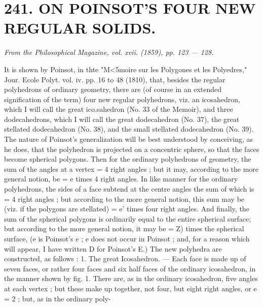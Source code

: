 \documentclass[11pt,a4paper]{book}
\begin{document}
\section*{241. ON  POINSOT'S  FOUR   NEW   REGULAR   SOLIDS.}
\begin{flushright}
\textit{From  the  Philosophical  Magazine,  vol.  xvii.  (1859),  pp.  123 — 128.}\n\end{flushright}
\vspace{0.5em}
It  is  shown  by  Poinsot,  in  thte  "M<5moire  sur  les  Polygones  et  les  Polyedres,"
Jour.  Ecole  Polyt.  vol.  iv.  pp.  16  to  48  (1810),  that,  besides  the  regular  polyhedrons  of
ordinary  geometry,  there  are  (of  course  in  an  extended  signification  of  the  term)  four
new  regular  polyhedrons,  viz.  an  icosahedron,  which  I  will  call  the  great  ico.sahedron
(No.  33  of  the  Memoir),  and  three  dodecahedrons,  which  I  will  call  the  great
dodecahedron  (No.  37),  the  great  stellated  dodecahedron  (No.  38),  and  the  small
stellated  dodecahedron  (No.  39).  The  nature  of  Poinsot's  generalization  will  be  best
understood  by  conceiving,  as  he  does,  that  the  polyhedron  is  projected  on  a  concentric
sphere,  so  that  the  faces  become  spherical  polygons.  Then  for  the  ordinary  polyhedrons
of  geometry,  the  sum  of  the  angles  at  a  vertex  =  4  right  angles ;  but  it  may,
according  to  the  more  general  notion,  be  =  e  times  4  right  angles.  In  like  manner
for  the  ordinary  polyhedrons,  the  sides  of  a  face  subtend  at  the  centre  angles  the
sum  of  which  is  =  4  right  angles ;  but  according  to  the  more  general  notion,  this  sum
may  be  (viz.  if  the  polygons  are  stellated)  =  e'  times  four  right  angles.  And  finally,
the  sum  of  the  spherical  polygons  is  ordinarily  equal  to  the  entire  spherical  surface;
but  according  to  the  more  general  notion,  it  may  be  =  Z)  times  the  spherical  surface,
(e  is  Poinsot's  e ;  e  does  not  occur  in  Poinsot ;  and,  for  a  reason  which  will  appear,
I  have  written  D  for  Poinsot's  E.)
The  new  polyhedra  are  constructed,  as  follows :
1.  The  great  Icosahedron. — Each  face  is  made  up  of  seven  faces,  or  rather  four
faces  and  six  half  faces  of  the  ordinary  icosahedron,  in  the  manner  shown  by  fig.  1.
There  are,  as  in  the  ordinary  icosahedron,  five  angles  at  each  vertex ;  but  these  make
up   together,  not    four,    but    eight    right   angles,    or  e  =  2 ;   but,  as   in    the    ordinary   poly-
\end{document}
